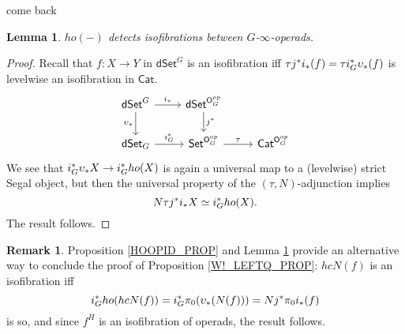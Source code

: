 \documentclass[a4paper,10pt
,draft
]{article}%
\numberwithin{equation}{section}
\numberwithin{figure}{section}
\newtheorem{lemma}[equation]{Lemma}%
\theoremstyle{definition} %
\newtheorem{remark}[equation]{Remark}%
\newcommand{\Set}{\ensuremath{\mathsf{Set}}}
\newcommand{\Cat}{\mathsf{Cat}}
\newcommand{\dSet}{\mathsf{dSet}}
\newcommand{\1}{\ensuremath{\mathbbm 1}}%
\begin{document}
come back

\begin{lemma}
      \label{HOXISOFIB_LEM}
      $ho(-)$ detects isofibrations between $G$-$\infty$-operads.
\end{lemma}
\begin{proof}
      Recall that $f \colon X \to Y$ in $\dSet^G$ is an isofibration iff
      \(
      \tau j^{\**}i_{\**}(f) = \tau i_G^{\**}\upsilon_{\**}(f)
      \)
      is levelwise an isofibration in $\Cat$.
      \[
            \begin{tikzcd}
                  \dSet^G \arrow[r, "i_{\**}"] \arrow[d, "\upsilon_{\**}"']
                  &
                  \dSet^{\mathsf O_G^{op}} \arrow[d, "j^{\**}"]
                  \\
                  \dSet_G \arrow[r, "i_G^{\**}"]
                  &
                  \Set^{\mathsf O_G^{op}} \arrow[r, "\tau"]
                  &
                  \Cat^{\mathsf O_G^{op}}
            \end{tikzcd}
      \]
      We see that $i_G^{\**} \upsilon_{\**} X \to i_G^{\**} ho(X)$ is again a universal map to a (levelwise) strict Segal object,
      but then the universal property of the $(\tau, N)$-adjunction implies
      \[
            N\tau j^{\**}i_{\**}X \simeq i_G^{\**} ho(X).
      \]
      The result follows.
\end{proof}

\begin{remark}
      \label{W!_LEFTQ_REM}
      Proposition \ref{HOOPID_PROP} and Lemma \ref{HOXISOFIB_LEM}
      provide an alternative way to conclude the proof of Proposition \ref{W!_LEFTQ_PROP}:
      $hcN(f)$ is an isofibration iff
      \[
            i_G^{\**}ho(hcN(f)) = i_G^{\**} \pi_0(\upsilon_{\**}(N(f))) = N j^{\**} \pi_0 i_{\**}(f)
      \]
      is so,
      and since $f^H$ is an isofibration of operads, the result follows.
\end{remark}










{}

\end{document}
